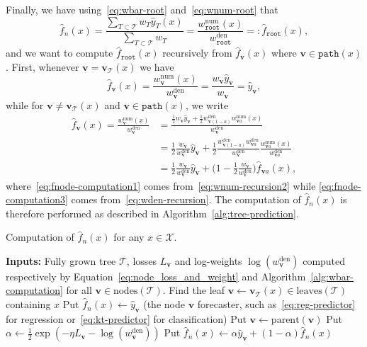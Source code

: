 \documentclass{article}
\newcommand{\wh}{\widehat}
\newcommand{\cX}{\mathcal X}
\newcommand{\pred}{\widehat{y}}
\newcommand{\node}{\mathbf{v}} %
\newcommand{\nodes}{\mathrm{nodes}} %
\newcommand{\leaves}{\mathrm{leaves}} %
\renewcommand{\root}{\mathtt{root}} %
\newcommand{\tree}{\mathcal{T}} %
\newcommand{\pathpoint}{\mathtt{path}} %
\newcommand{\wbar}{w^{\mathrm{den}}} %
\newcommand{\wnum}{w^{\mathrm{num}}} %
\begin{document}
Finally, we have using~\eqref{eq:wbar-root} and~\eqref{eq:wnum-root} that
\begin{equation*}
    \wh f_n(x) = \frac{\sum_{T \subset \tree} w_T \pred_{T} (x)}{\sum_{T \subset \tree} w_T} = \frac{\wnum_\root(x)}{\wbar_\root} =: \wh f_{\root}(x),
\end{equation*}
and we want to compute $\wh f_{\root}(x)$ recursively from $\wh f_{\node}(x)$ where $\node \in \pathpoint(x)$.
First, whenever $\node = \node_\tree (x)$ we have
\begin{equation*}
    \wh f_\node(x) = \frac{\wnum_\node(x)}{\wbar_\node} = \frac{w_{\node} \pred_{\node}}{w_{\node}} = \pred_{\node},
\end{equation*}
while for $\node \neq  \node_\tree (x)$ and $\node \in \pathpoint(x)$, we write
\begin{align}
    \label{eq:fnode-computation1}
    \wh f_\node(x) = \frac{\wnum_\node(x)}{\wbar_\node} 
    &= \frac{\frac{1}{2} w_{\node} \pred_{\node} + \frac{1}{2} \wbar_{\node (1-a)} \wnum_{\node a}(x)}{\wbar_\node} \\
    \label{eq:fnode-computation2}
    &= \frac 12 \frac{w_{\node}}{\wbar_\node} \pred_{\node} 
    + \frac 12 \frac{\wbar_{\node (1-a)} \wbar_{\node a}} {\wbar_\node} \frac{\wnum_{\node a}(x)}{\wbar_{\node a}} \\
    \label{eq:fnode-computation3}
    &= \frac 12 \frac{w_{\node}}{\wbar_\node} \pred_{\node} + \Big(1 - \frac 12  \frac{w_{\node}}{\wbar_\node} \Big) \wh f_{\node a}(x),
\end{align}
where~\eqref{eq:fnode-computation1} comes from~\eqref{eq:wnum-recursion2} while \eqref{eq:fnode-computation3} comes from~\eqref{eq:wden-recursion}.
The computation of $\wh f_n(x)$ is therefore performed as described in Algorithm~\ref{alg:tree-prediction}.

\begin{algorithm}[htbp]
    \caption{Computation of $\wh f_n(x)$ for any $x \in \cX$.}
    \label{alg:tree-prediction}
    \begin{algorithmic}[1]
      \STATE \textbf{Inputs:} Fully grown tree $\tree$, losses $L_\node$ and log-weights $\log(\wbar_\node)$ computed respectively by Equation~\eqref{eq:node_loss_and_weight} and Algorithm~\ref{alg:wbar-computation} for all $\node \in \nodes(\tree)$.
      \STATE Find the leaf $\node \gets \node_\tree(x) \in \leaves(\tree)$ containing $x$ 
      \STATE Put $\wh f_n(x) \gets \pred_\node$ (the node $\node$ forecaster, such as~\eqref{eq:reg-predictor} for regression or~\eqref{eq:kt-predictor} for classification)
      \WHILE{$\node \neq \root$}
      \STATE Put $\node \gets \mathrm{parent}(\node)$
      \STATE Put $\alpha \gets \frac 12 \exp(-\eta L_\node - \log(\wbar_\node))$ 
      \STATE Put $\wh f_n(x) \gets \alpha \pred_\node + (1 - \alpha) \wh f_n(x)$
      \ENDWHILE
      \RETURN {The prediction $\wh f_n(x)$}
    \end{algorithmic}
\end{algorithm}
\end{document}
